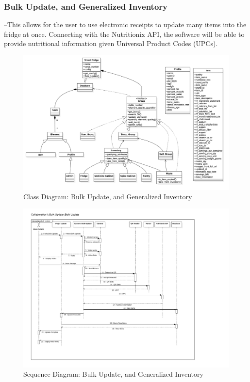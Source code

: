 	\subsubsection{Bulk Update, and Generalized Inventory}--This allows for the user to use electronic receipts to update many items into the fridge at once. Connecting with the Nutritionix API, the software will be able to provide nutritional information given Universal Product Codes (UPCs). 
				\begin{figure}[p]
					\centering
					\includegraphics[width=\textwidth]{bulkupdate.png}
					\caption{Class Diagram: Bulk Update, and Generalized Inventory}
				\end{figure}
				\begin{figure}[p]
					\centering
					\includegraphics[width=\textwidth]{bulkupdate.pdf}
					\caption{Sequence Diagram: Bulk Update, and Generalized Inventory}
				\end{figure}
